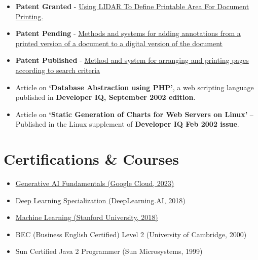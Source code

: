 \documentclass[a4paper,12pt]{article}
\begin{document}
\begin{itemize}
  \setlength\itemsep{-0.5em}

\item
  \textbf{Patent Granted} -
  \href{https://patents.justia.com/patent/20240281181}{Using LIDAR To
    Define Printable Area For Document Printing.}
  
\item
  \textbf{Patent Pending} -
  \href{https://patents.google.com/patent/US20230289515A1}{Methods
    and systems for adding annotations from a printed version of a
    document to a digital version of the document}

\item \textbf{Patent Published} -
  \href{https://patents.google.com/patent/US20190294385A1}{Method and
    system for arranging and printing pages according to search
    criteria}

\item Article on \textbf{`Database Abstraction using PHP'}, a web scripting
  language published in \textbf{Developer IQ, September 2002 edition}.

\item Article on \textbf{`Static Generation of Charts for Web Servers
  on Linux'} – Published in the Linux supplement of
  \textbf{Developer IQ Feb 2002 issue}.

\end{itemize}


\section*{Certifications \& Courses}

\begin{itemize}
  
  \setlength\itemsep{-0.5em}

\item \href{https://partner.cloudskillsboost.google/public_profiles/c3662c2a-8b10-4480-9922-dc384a446a1d}{Generative AI Fundamentals (Google Cloud, 2023)}
  
\item
  \href{https://www.coursera.org/account/accomplishments/specialization/Y9XD9ZQ3EGG2}{Deep Learning Specialization (DeepLearning.AI, 2018)}
  
\item
  \href{https://www.coursera.org/account/accomplishments/verify/2YVCNYET6XSL}{Machine Learning (Stanford University, 2018)}

\item BEC (Business English Certified) Level 2 (University of Cambridge, 2000)
  
\item Sun Certified Java 2 Programmer (Sun Microsystems, 1999)
  
\end{itemize}
\end{document}
